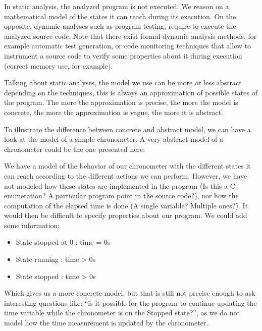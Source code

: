 In static analysis, the analyzed program is not executed. We reason on a
mathematical model of the states it can reach during its execution. On
the opposite, dynamic analyses such as program testing, require to
execute the analyzed source code. Note that there exist formal dynamic
analysis methods, for example automatic test generation, or code
monitoring techniques that allow to instrument a source code to verify
some properties about it during execution (correct memory use, for
example).



Talking about static analyses, the model we use can be more or less
abstract depending on the techniques, this is always an approximation of
possible states of the program. The more the approximation is precise,
the more the model is concrete, the more the approximation is vague, the
more it is abstract.



To illustrate the difference between concrete and abstract model, we can
have a look at the model of a simple chronometer. A very abstract model of
a chronometer could be the one presented here:





We have a model of the behavior of our chronometer with the different
states it can reach according to the different actions we can perform.
However, we have not modeled how these states are implemented in the
program (Is this a C enumeration? A particular program point in the
source code?), nor how the computation of the elapsed time is done (A single
variable? Multiple ones?). It would then be difficult to specify
properties about our program. We could add some information:


\begin{itemize}
\item State stopped at 0 : time = 0s
\item State running : time > 0s
\item State stopped : time > 0s
\end{itemize}



Which gives us a more concrete model, but that is still not precise
enough to ask interesting questions like: ``is it possible for the program
to continue updating the time variable while the chronometer is on the Stopped
state?'', as we do not model how the time measurement is updated by the
chronometer.



